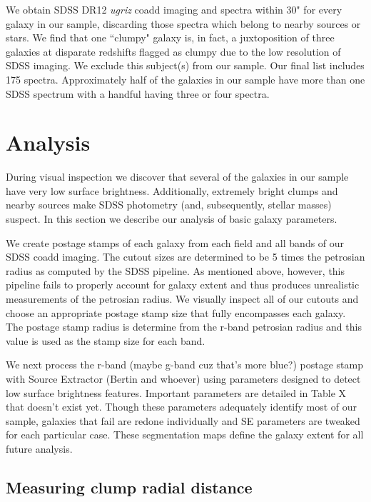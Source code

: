 \documentclass[twocolumn]{aastex6}
\begin{document}
We obtain SDSS DR12 \textit{ugriz} coadd imaging and spectra within 30" for every galaxy in our sample, discarding those spectra which belong to nearby sources or stars. We find that one ``clumpy" galaxy is, in fact, a juxtoposition of three galaxies at disparate redshifts flagged as clumpy due to the low resolution of SDSS imaging. We exclude this subject(s) from our sample.  Our final list includes 175 spectra. Approximately half of the galaxies in our sample have more than one SDSS spectrum with a handful having three or four spectra.  



\section{Analysis}
During visual inspection we discover that several of the galaxies in our sample have very low surface brightness. Additionally, extremely bright clumps and nearby sources make SDSS photometry (and, subsequently, stellar masses) suspect. In this section we describe our analysis of basic galaxy parameters. 

We create postage stamps of each galaxy from each field and all bands of our SDSS coadd imaging. The cutout sizes are determined to be 5 times the petrosian radius as computed by the SDSS pipeline. As mentioned above, however, this pipeline fails to properly account for galaxy extent and thus produces unrealistic measurements of the petrosian radius. We visually inspect all of our cutouts and choose an appropriate postage stamp size that fully encompasses each galaxy. The postage stamp radius is determine from the r-band petrosian radius and this value is used as the stamp size for each band. 

We next process the r-band (maybe g-band cuz that's more blue?) postage stamp with Source Extractor (Bertin and whoever) using parameters designed to detect low surface brightness features. Important parameters are detailed in Table X that doesn't exist yet. Though these parameters adequately identify most of our sample, galaxies that fail are redone individually and SE parameters are tweaked for each particular case. These segmentation maps define the galaxy extent for all future analysis. 



\subsection{Measuring clump radial distance} \label{subsec:radii}
\end{document}
